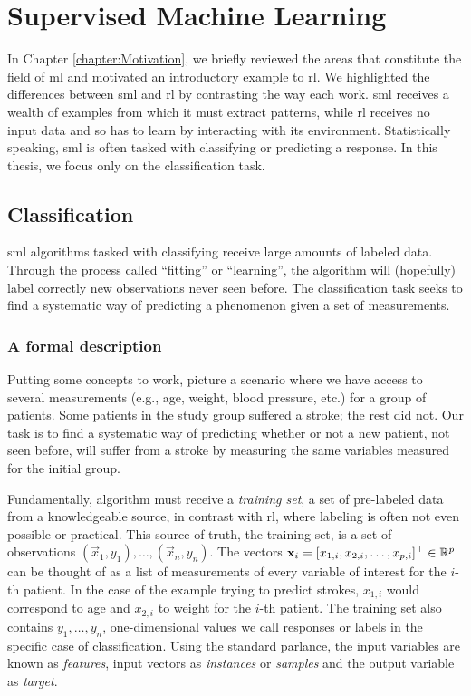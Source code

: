 \chapter{Supervised Machine Learning}
\label{chapter:SupervisedLearning}

In Chapter \ref{chapter:Motivation}, we briefly reviewed the areas that
constitute the field of \ac{ml} and motivated an introductory example to
\acl{rl}. We highlighted the differences between \ac{sml} and \ac{rl} by
contrasting the way each work. \Ac{sml} receives a wealth of examples from which
it must extract patterns, while \ac{rl} receives no input data and so has to
learn by interacting with its environment. Statistically speaking, \ac{sml} is
often tasked with classifying or predicting a response. In this thesis, we focus
only on the classification task.

\section{Classification}

\Ac{sml} algorithms tasked with classifying receive large amounts of
labeled data. Through the process called ``fitting'' or ``learning'', the
algorithm will (hopefully) label correctly new observations never seen before.
The classification task seeks to find a systematic way of predicting a
phenomenon given a set of measurements.

\subsection{A formal description} \label{sss:formalizing-trees}

Putting some concepts to work, picture a scenario where we have access to
several measurements (e.g., age, weight, blood pressure, etc.) for a group of
patients. Some patients in the study group suffered a stroke; the rest did not.
Our task is to find a systematic way of predicting whether or not a new patient,
not seen before, will suffer from a stroke by measuring the same variables
measured for the initial group.

Fundamentally,  algorithm must receive a \textit{training set}, a set
of pre-labeled data from a knowledgeable source, in contrast with \ac{rl}, where
labeling is often not even possible or practical. This source of truth, the
training set, is a set of observations $(\vec{x}_1, y_1), \dots, (\vec{x}_n,
y_n)$. The vectors $\mathbf{x}_i = [x_{1, i}, x_{2, i}, \dots, x_{p, i}]^{\top} \in
\mathbb{R}^{p}$ can be thought of as a list of measurements of every variable of
interest for the $i$-th patient. In the case of the example trying to predict
strokes, $x_{1, i}$ would correspond to age and $x_{2, i}$ to weight for the
$i$-th patient. The training set also contains $y_1, \dots, y_n$,
one-dimensional values we call responses or labels in the specific case of
classification. Using the standard parlance, the input variables are known as
\textit{features}, input vectors as \textit{instances} or \textit{samples} and
the output variable as \textit{target}.

